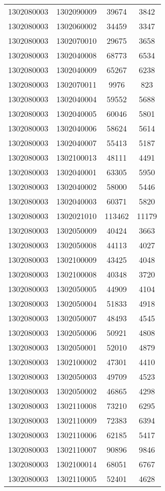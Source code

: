 \begin{longtable}{llcc}
1302080003 & 1302090009 & 39674 & 3842\\
1302080003 & 1302060002 & 34459 & 3347\\
1302080003 & 1302070010 & 29675 & 3658\\
1302080003 & 1302040008 & 68773 & 6534\\
1302080003 & 1302040009 & 65267 & 6238\\
1302080003 & 1302070011 & 9976 & 823\\
1302080003 & 1302040004 & 59552 & 5688\\
1302080003 & 1302040005 & 60046 & 5801\\
1302080003 & 1302040006 & 58624 & 5614\\
1302080003 & 1302040007 & 55413 & 5187\\
1302080003 & 1302100013 & 48111 & 4491\\
1302080003 & 1302040001 & 63305 & 5950\\
1302080003 & 1302040002 & 58000 & 5446\\
1302080003 & 1302040003 & 60371 & 5820\\
1302080003 & 1302021010 & 113462 & 11179\\
1302080003 & 1302050009 & 40424 & 3663\\
1302080003 & 1302050008 & 44113 & 4027\\
1302080003 & 1302100009 & 43425 & 4048\\
1302080003 & 1302100008 & 40348 & 3720\\
1302080003 & 1302050005 & 44909 & 4104\\
1302080003 & 1302050004 & 51833 & 4918\\
1302080003 & 1302050007 & 48493 & 4545\\
1302080003 & 1302050006 & 50921 & 4808\\
1302080003 & 1302050001 & 52010 & 4879\\
1302080003 & 1302100002 & 47301 & 4410\\
1302080003 & 1302050003 & 49709 & 4523\\
1302080003 & 1302050002 & 46865 & 4298\\
1302080003 & 1302110008 & 73210 & 6295\\
1302080003 & 1302110009 & 72383 & 6394\\
1302080003 & 1302110006 & 62185 & 5417\\
1302080003 & 1302110007 & 90896 & 9846\\
1302080003 & 1302100014 & 68051 & 6767\\
1302080003 & 1302110005 & 52401 & 4628\\

\end{longtable}

